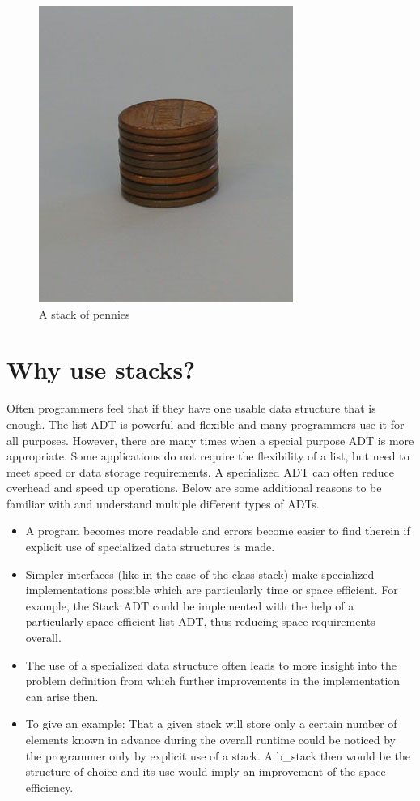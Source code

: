 \begin{figure}[H]
\centering
\includegraphics{pictures/pennies.jpg}
\caption{A stack of pennies}
\label{fig:pennies}
\end{figure}

\section{Why use stacks?}

Often programmers feel that if they have one usable data structure  that is enough.  The list ADT is powerful and flexible and many programmers use it for all purposes.  However, there are many times when a special purpose ADT is more appropriate.  Some applications do not require the flexibility of a list, but need to meet speed or data storage requirements.  A specialized ADT can often reduce overhead and speed up operations.  Below are some additional reasons to be familiar with and understand multiple different types of ADTs.

\begin{itemize}
\item A program becomes more readable and errors become easier to find therein if explicit use of specialized data structures is made. 
\item Simpler interfaces (like in the case of the class stack) make specialized implementations possible which are particularly time or space efficient. For example, the Stack ADT could be implemented with the help of a particularly space-efficient list ADT, thus reducing space requirements overall.  
\item The use of a specialized data structure often leads to more insight into the problem definition from which further improvements in the implementation can arise then. 
\item To give an example: That a given stack will store only a certain number of elements known in advance during the overall runtime could be noticed by the programmer only by explicit use of a stack. A b\_stack then would be the structure of choice and its use would imply an improvement of the space efficiency. 
\end{itemize}


